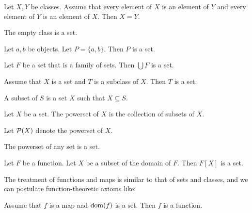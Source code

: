 \documentclass{article}
\begin{document}
\begin{forthel}
\begin{lemma}[title=Extensionality Axiom]
    Let $X, Y$ be classes.
    Assume that every element of $X$ is an element of $Y$ and every element of
    $Y$ is an element of $X$.
    Then $X = Y$.
\end{lemma}

\begin{axiom}[title=Set Existence Axiom]
The empty class is a set.
\end{axiom}

\begin{axiom}[title=Pairing Axiom]
Let $a,b$ be objects. Let $P = \{a,b\}$. Then $P$  is a set.
\end{axiom}

\begin{axiom}[title=Union Axiom]
Let $F$ be a set that is a family of sets. Then
$\bigcup F$ is a set.
\end{axiom}

\begin{axiom}[title=Separation Axiom]
    Assume that $X$ is a set and $T$ is a subclass of $X$.
    Then $T$ is a set.
\end{axiom}

\begin{definition}
A subset of $S$ is a set $X$ such that $X \subseteq S$.
\end{definition}

\begin{definition}
      Let $X$ be a set.
      The powerset of $X$ is the collection of subsets of $X$.
\end{definition}

Let ${\cal P}(X)$ denote the powerset of $X$.

\begin{axiom}[title=Powerset Axiom]
  The powerset of any set is a set.
\end{axiom}

\begin{axiom}[title=Replacement Axiom]
Let $F$ be a function.
Let $X$ be a subset of the domain of $F$.
Then $F[X]$ is a set.
\end{axiom}
\end{forthel}

The treatment of functions and maps is similar to that
of sets and classes, and we can postulate function-theoretic
axioms like:

\begin{forthel}
  \begin{axiom}
    Assume that $f$ is a map and $\operatorname{dom}(f)$ is a set.
    Then $f$ is a function.
  \end{axiom}
\end{forthel}
\end{document}
